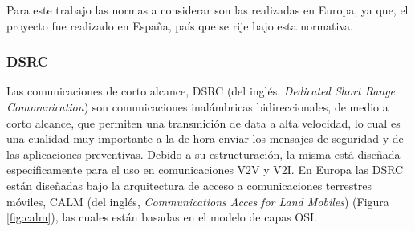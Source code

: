 \begin{table}[htbp]
  \centering
{}%
\caption{Comparativa de las especificaciones de las VANET's}
  \label{tab:vanl}%
\end{table}%

\par Para este trabajo las normas a considerar son las realizadas en Europa, ya que, el proyecto fue realizado en España, país que se rije bajo esta normativa.       

\subsubsection{DSRC}

Las comunicaciones de corto alcance, DSRC (del inglés, \textit{ Dedicated Short Range Communication}) son comunicaciones inalámbricas bidireccionales, de medio a corto alcance, que permiten una transmición de data a alta velocidad, lo cual es una cualidad muy importante a la de hora enviar los mensajes de seguridad y de las aplicaciones preventivas. Debido a su estructuración, la misma está diseñada específicamente para el uso en comunicaciones V2V y V2I. En Europa las DSRC están diseñadas bajo la arquitectura de acceso a comunicaciones terrestres móviles, CALM (del inglés, \textit{Communications Acces for Land Mobiles}) (Figura \ref{fig:calm}), las cuales están basadas en el modelo de capas OSI.\\

